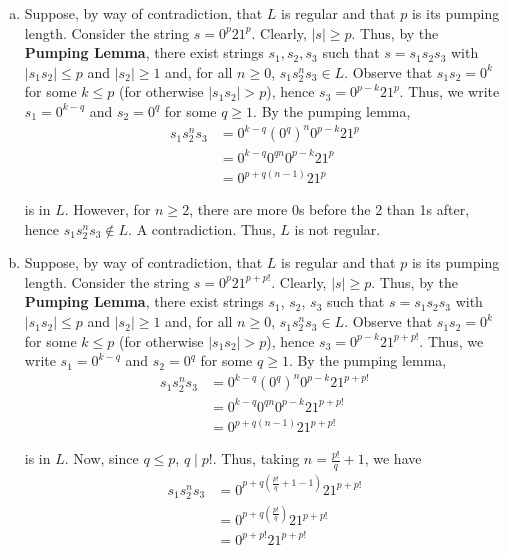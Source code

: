 \begin{solution}\mbox{\\}
\begin{enumerate}[(a)]
    \item Suppose, by way of contradiction, that \(L\) is regular and that \(p\) is its pumping length. Consider the string \(s=0^p21^p\). Clearly, \(|s|\geq p\). Thus, by the \textbf{Pumping Lemma}, there exist strings \(s_1, s_2, s_3\) such that \(s=s_1s_2s_3\) with \(|s_1s_2|\leq p\) and \(|s_2|\geq1\) and, for all \(n\geq 0\), \(s_1s_2^n s_3\in L\). Observe that \(s_1s_2=0^k\) for some \(k\leq p\) (for otherwise \(|s_1s_2| > p\)), hence \(s_3=0^{p-k}21^p\). Thus, we write \(s_1=0^{k-q}\) and \(s_2=0^{q}\) for some \(q\geq1\). By the pumping lemma, 
    \begin{align*}
        s_1s_2^n s_3 &= 0^{k-q}{(0^q)}^n0^{p-k}21^p\\
                    &= 0^{k-q}0^{qn}0^{p-k}21^p\\
                    &= 0^{p+q(n-1)}21^p
    \end{align*}

    is in \(L\). However, for \(n\geq2\), there are more 0s before the 2 than 1s after, hence \(s_1s_2^n s_3\not\in L\). A contradiction. Thus, \(L\) is not regular.

    \item Suppose, by way of contradiction, that \(L\) is regular and that \(p\) is its pumping length. Consider the string \(s=0^p21^{p+p!}\). Clearly, \(|s|\geq p\). Thus, by the \textbf{Pumping Lemma}, there exist strings \(s_1\), \(s_2\), \(s_3\) such that \(s=s_1s_2s_3\) with \(|s_1s_2|\leq p\) and \(|s_2|\geq1\) and, for all \(n\geq 0\), \(s_1s_2^n s_3\in L\). Observe that \(s_1s_2=0^k\) for some \(k\leq p\) (for otherwise \(|s_1s_2| > p\)), hence \(s_3=0^{p-k}21^{p+p!}\). Thus, we write \(s_1=0^{k-q}\) and \(s_2=0^{q}\) for some \(q\geq1\). By the pumping lemma, 
    \begin{align*}
        s_1s_2^n s_3 &= 0^{k-q}{(0^q)}^n0^{p-k}21^{p+p!}\\
                    &= 0^{k-q}0^{qn}0^{p-k}21^{p+p!}\\
                    &= 0^{p+q(n-1)}21^{p+p!}
    \end{align*}

    is in \(L\). Now, since \(q\leq p\), \(q\mid p{!}\). Thus, taking \(n=\frac{p!}{q}+1\), we have 
    \begin{align*}
        s_1s_2^n s_3 &= 0^{p+q(\frac{p!}{q}+1-1)}21^{p+p!}\\
                    &= 0^{p+q(\frac{p!}{q})}21^{p+p!}\\
                    &= 0^{p+p!}21^{p+p!}
    \end{align*}
    

\end{enumerate}
\end{solution}
